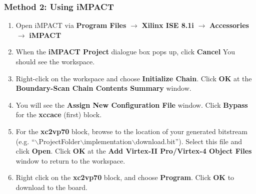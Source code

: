 			
		\subsubsection{Method 2: Using iMPACT}
			\begin{enumerate}
				
				\item Open iMPACT via \textbf{Program Files} $\rightarrow$ \textbf{Xilinx ISE 8.1i} $\rightarrow$ \textbf{Accessories} $\rightarrow$ \textbf{iMPACT}
				
				\item When the \textbf{iMPACT Project} dialogue box pops up, click \textbf{Cancel} You should see the workspace. 
				
								
\item Right-click on the workspace and choose \textbf{Initialize Chain}. Click \textbf{OK} at the \textbf{Boundary-Scan Chain Contents Summary} window.
				
				\item You will see the \textbf{Assign New Configuration File} window. Click \textbf{Bypass} for the \textbf{xccace} (first) block.
				
				\item For the \textbf{xc2vp70} block, browse to the location of your generated bitstream (e.g. ``$\backslash$ProjectFolder$\backslash$implementation$\backslash$download.bit''). Select this file and click \textbf{Open}. Click \textbf{OK} at the \textbf{Add Virtex-II Pro/Virtex-4 Object Files} window to return to the workspace.
				
				\item Right click on the \textbf{xc2vp70} block, and choose \textbf{Program}. Click \textbf{OK} to download to the board.
			\end{enumerate}
		
